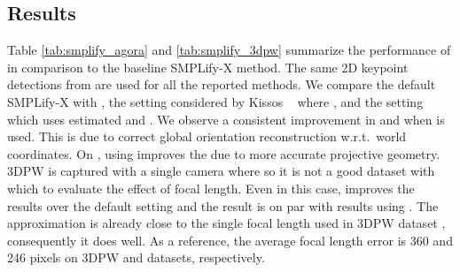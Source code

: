 \documentclass[10pt,twocolumn,letterpaper,usenames,dvipsnames]{article}
\begin{document}
\subsection{\smplify Results}
\label{sec:smplifycam_evaluation}
Table \ref{tab:smplify_agora} and \ref{tab:smplify_3dpw} summarize the performance of \smplify in comparison to the baseline SMPLify-X method. 
The same 2D keypoint detections from \cite{mmpose2020} are used for all the reported methods. 
We compare the default SMPLify-X with  \cite{SMPL-X:2019}, the setting considered by Kissos \etal~\cite{kissosECCVW2020} where , and the setting which uses \camcalib estimated  and . 
We observe a consistent improvement in \wmpjpe and \wpve when  is used. 
This is due to correct global orientation reconstruction w.r.t.~world coordinates. 
On \agoracam, using  improves the \pampjpe due to more accurate projective geometry. 
3DPW is captured with a single camera where  so it is not a good dataset with which to evaluate the effect of focal length.
Even in this case, \smplify improves the results over the default setting and the \pampjpe result is on par with results using . 
The  approximation is already close to the single focal length used in 3DPW dataset , consequently it does well.
As a reference, the average \camcalib focal length error is 360 and 246 pixels on 3DPW and \agoracam datasets, respectively.
\end{document}
